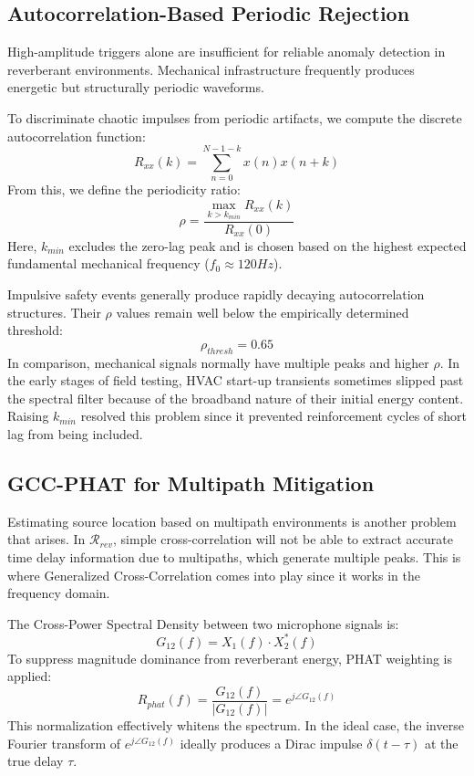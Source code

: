 \documentclass[conference]{IEEEtran}
\begin{document}
\subsection{Autocorrelation-Based Periodic Rejection}
High-amplitude triggers alone are insufficient for reliable anomaly detection in reverberant environments. Mechanical infrastructure frequently produces energetic but structurally periodic waveforms.

To discriminate chaotic impulses from periodic artifacts, we compute the discrete autocorrelation function:
\begin{equation}
R_{xx}(k) = \sum_{n=0}^{N-1-k} x(n)x(n+k)
\end{equation}
From this, we define the periodicity ratio:
\begin{equation}
\rho = \frac{\max_{k > k_{min}} R_{xx}(k)}{R_{xx}(0)}
\end{equation}
Here, $k_{min}$ excludes the zero-lag peak and is chosen based on the highest expected fundamental mechanical frequency ($f_0 \approx 120Hz$).

Impulsive safety events generally produce rapidly decaying autocorrelation structures. Their $\rho$ values remain well below the empirically determined threshold:
\begin{equation}
\rho_{thresh} = 0.65
\end{equation}
In comparison, mechanical signals normally have multiple peaks and higher $\rho$. In the early stages of field testing, HVAC start-up transients sometimes slipped past the spectral filter because of the broadband nature of their initial energy content. Raising $k_{min}$ resolved this problem since it prevented reinforcement cycles of short lag from being included.

\subsection{GCC-PHAT for Multipath Mitigation}

Estimating source location based on multipath environments is another problem that arises. In $\mathcal{R}_{rev}$, simple cross-correlation will not be able to extract accurate time delay information due to multipaths, which generate multiple peaks. This is where Generalized Cross-Correlation comes into play since it works in the frequency domain.

The Cross-Power Spectral Density between two microphone signals is:
\begin{equation}
G_{12}(f) = X_1(f) \cdot X_2^*(f)
\end{equation}
To suppress magnitude dominance from reverberant energy, PHAT weighting is applied:
\begin{equation}
R_{phat}(f) = \frac{G_{12}(f)}{|G_{12}(f)|} = e^{j\angle G_{12}(f)}
\end{equation}
This normalization effectively whitens the spectrum. In the ideal case, the inverse Fourier transform of $e^{j\angle G_{12}(f)}$ ideally produces a Dirac impulse $\delta(t - \tau)$ at the true delay $\tau$.
\end{document}
